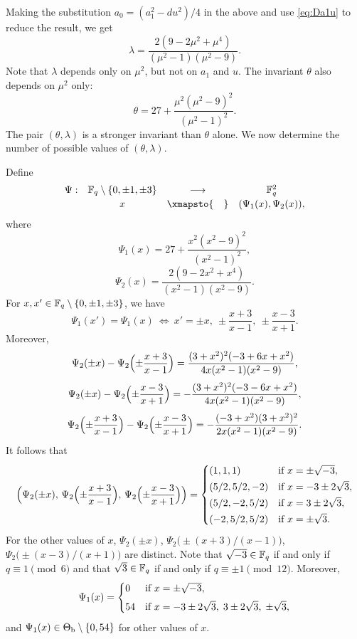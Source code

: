 \documentclass{amsart}
\numberwithin{equation}{section}
\theoremstyle{definition}
\newcommand{\f}{\Bbb F}
\begin{document}
Making the substitution $a_0=(a_1^2-du^2)/4$ in the above and use \eqref{eq:Da1u} to reduce the result, we get
\begin{equation}\label{lba-m}
\lambda=\frac{2(9-2\mu^2+\mu^4)}{(\mu^2-1)(\mu^2-9)}.
\end{equation}
Note that $\lambda$ depends only on $\mu^2$, but not on $a_1$ and $u$. The invariant $\theta$ also depends on $\mu^2$ only:
\begin{equation}\label{eq:the-mu2}
\theta=27+\frac{\mu^2(\mu^2-9)^2}{(\mu^2-1)^2}.
\end{equation}
The pair $(\theta,\lambda)$ is a stronger invariant than $\theta$ alone. We now determine the number of possible values of $(\theta,\lambda)$.

Define
\[
\begin{array}{cccc}
\Psi:&\f_q\setminus\{0,\pm1,\pm3\}&\longrightarrow &\f_q^2\vspace{0.2em}\cr
&x&\xmapsto{\hspace{1em}} &(\Psi_1(x),\Psi_2(x)),
\end{array}
\]
where 
\[
\Psi_1(x)=27+\frac{x^2(x^2-9)^2}{(x^2-1)^2},
\]
\[
\Psi_2(x)=\frac{2(9-2x^2+x^4)}{(x^2-1)(x^2-9)}.
\]
For $x,x'\in\f_q\setminus\{0,\pm1,\pm3\}$, we have
\[
\Psi_1(x')=\Psi_1(x)\ \Leftrightarrow\ x'=\pm x,\ \pm\frac{x+3}{x-1},\ \pm\frac{x-3}{x+1}.
\]
Moreover,
\[
\Psi_2(\pm x)-\Psi_2\Bigl(\pm\frac{x+3}{x-1}\Bigr)=\frac{(3+x^2)^2(-3+6x+x^2)}{4x(x^2-1)(x^2-9)},
\]
\[
\Psi_2(\pm x)-\Psi_2\Bigl(\pm\frac{x-3}{x+1}\Bigr)=-\frac{(3+x^2)^2(-3-6x+x^2)}{4x(x^2-1)(x^2-9)},
\]
\[
\Psi_2\Bigl(\pm\frac{x+3}{x-1}\Bigr)-\Psi_2\Bigl(\pm\frac{x-3}{x+1}\Bigr)=-\frac{(-3+x^2)(3+x^2)^2}{2x(x^2-1)(x^2-9)}.
\]
It follows that
\[
\Bigl(\Psi_2(\pm x),\, \Psi_2\Bigl(\pm\frac{x+3}{x-1}\Bigr),\, \Psi_2\Bigl(\pm\frac{x-3}{x+1}\Bigr)\Bigr)=
\begin{cases}
(1,1,1)&\text{if}\ x=\pm\sqrt{-3},\vspace{0.2em}\cr
(5/2,5/2,-2)&\text{if}\ x=-3\pm 2\sqrt 3,\vspace{0.2em}\cr
(5/2,-2, 5/2)&\text{if}\ x=3\pm 2\sqrt 3,\vspace{0.2em}\cr
(-2,5/2,5/2)&\text{if}\ x=\pm\sqrt 3.
\end{cases}
\]
For the other values of $x$, $\Psi_2(\pm x)$, $\Psi_2\bigl(\pm(x+3)/(x-1)\bigr)$, $\Psi_2\bigl(\pm(x-3)/(x+1)\bigr)$ are distinct. Note that $\sqrt{-3}\in\f_q$ if and only if $q\equiv 1\pmod 6$ and that $\sqrt 3\in\f_q$ if and only if $q\equiv \pm1\pmod{12}$.
Moreover,
\[
\Psi_1(x)=\begin{cases}
0&\text{if}\ x=\pm\sqrt{-3},\vspace{0.4em}\cr
54&\text{if}\ x=-3\pm2\sqrt3,\; 3\pm2\sqrt3,\;\pm\sqrt3,
\end{cases}
\]
and $\Psi_1(x)\in\Theta_{\rm b}\setminus\{0,54\}$ for other values of $x$.
\end{document}
